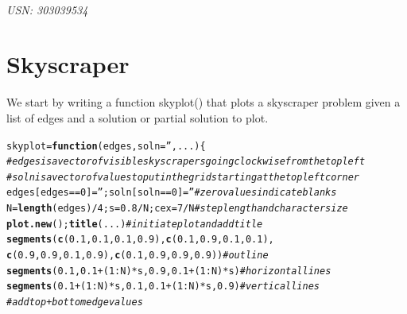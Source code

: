 \documentclass[12pt]{article}\usepackage[]{graphicx}\usepackage[]{color}
\makeatletter
\newcommand{\hlnum}[1]{\textcolor[rgb]{0.686,0.059,0.569}{#1}}%
\newcommand{\hlstr}[1]{\textcolor[rgb]{0.192,0.494,0.8}{#1}}%
\newcommand{\hlcom}[1]{\textcolor[rgb]{0.678,0.584,0.686}{\textit{#1}}}%
\newcommand{\hlopt}[1]{\textcolor[rgb]{0,0,0}{#1}}%
\newcommand{\hlstd}[1]{\textcolor[rgb]{0.345,0.345,0.345}{#1}}%
\newcommand{\hlkwa}[1]{\textcolor[rgb]{0.161,0.373,0.58}{\textbf{#1}}}%
\newcommand{\hlkwb}[1]{\textcolor[rgb]{0.69,0.353,0.396}{#1}}%
\newcommand{\hlkwc}[1]{\textcolor[rgb]{0.333,0.667,0.333}{#1}}%
\newcommand{\hlkwd}[1]{\textcolor[rgb]{0.737,0.353,0.396}{\textbf{#1}}}%
\newenvironment{kframe}{%
 \def\at@end@of@kframe{}%
 \ifinner\ifhmode%
  \def\at@end@of@kframe{\end{minipage}}%
  \begin{minipage}{\columnwidth}%
 \fi\fi%
 \def\FrameCommand##1{\hskip\@totalleftmargin \hskip-\fboxsep
 \colorbox{shadecolor}{##1}\hskip-\fboxsep
     \hskip-\linewidth \hskip-\@totalleftmargin \hskip\columnwidth}%
 \MakeFramed {\advance\hsize-\width
   \@totalleftmargin\z@ \linewidth\hsize
   \@setminipage}}%
 {\par\unskip\endMakeFramed%
 \at@end@of@kframe}
\newenvironment{knitrout}{}{} %
\makeatother
\begin{document}
\begin{center}
\textbf{\Large{}}\\
\textit{USN: 303039534}
\end{center}



\section{Skyscraper}
We start by writing a function skyplot() that plots a skyscraper problem given a list of edges and a solution or partial solution to plot.
\begin{knitrout}
\color{fgcolor}\begin{kframe}
\begin{alltt}
\hlstd{skyplot} \hlkwb{=} \hlkwa{function}\hlstd{(}\hlkwc{edges}\hlstd{,} \hlkwc{soln} \hlstd{=} \hlstr{''}\hlstd{,} \hlkwc{...}\hlstd{)\{}
  \hlcom{#edges is a vector of visible skyscrapers going clockwise from the top left}
  \hlcom{#soln is a vector of values to put in the grid starting at the top left corner}
  \hlstd{edges[edges} \hlopt{==} \hlnum{0}\hlstd{]} \hlkwb{=} \hlstr{''}\hlstd{; soln[soln}\hlopt{==}\hlnum{0}\hlstd{]}\hlkwb{=}\hlstr{''} \hlcom{#zero values indicate blanks}
  \hlstd{N} \hlkwb{=} \hlkwd{length}\hlstd{(edges)} \hlopt{/} \hlnum{4}\hlstd{; s} \hlkwb{=} \hlnum{0.8}\hlopt{/}\hlstd{N; cex} \hlkwb{=} \hlnum{7}\hlopt{/}\hlstd{N} \hlcom{#step length and character size}
  \hlkwd{plot.new}\hlstd{();} \hlkwd{title}\hlstd{(...)} \hlcom{#initiate plot and add title}
  \hlkwd{segments}\hlstd{(} \hlkwd{c}\hlstd{(}\hlnum{0.1}\hlstd{,}\hlnum{0.1}\hlstd{,}\hlnum{0.1}\hlstd{,}\hlnum{0.9}\hlstd{),} \hlkwd{c}\hlstd{(}\hlnum{0.1}\hlstd{,}\hlnum{0.9}\hlstd{,}\hlnum{0.1}\hlstd{,}\hlnum{0.1}\hlstd{),}
            \hlkwd{c}\hlstd{(}\hlnum{0.9}\hlstd{,}\hlnum{0.9}\hlstd{,}\hlnum{0.1}\hlstd{,}\hlnum{0.9}\hlstd{),} \hlkwd{c}\hlstd{(}\hlnum{0.1}\hlstd{,}\hlnum{0.9}\hlstd{,}\hlnum{0.9}\hlstd{,}\hlnum{0.9}\hlstd{) )} \hlcom{#outline}
  \hlkwd{segments}\hlstd{(}\hlnum{0.1}\hlstd{,} \hlnum{0.1}\hlopt{+}\hlstd{(}\hlnum{1}\hlopt{:}\hlstd{N)}\hlopt{*}\hlstd{s,} \hlnum{0.9}\hlstd{,} \hlnum{0.1}\hlopt{+}\hlstd{(}\hlnum{1}\hlopt{:}\hlstd{N)}\hlopt{*}\hlstd{s)} \hlcom{#horizontal lines}
  \hlkwd{segments}\hlstd{(}\hlnum{0.1}\hlopt{+}\hlstd{(}\hlnum{1}\hlopt{:}\hlstd{N)}\hlopt{*}\hlstd{s,} \hlnum{0.1}\hlstd{,} \hlnum{0.1}\hlopt{+}\hlstd{(}\hlnum{1}\hlopt{:}\hlstd{N)}\hlopt{*}\hlstd{s,} \hlnum{0.9}\hlstd{)} \hlcom{#vertical lines}
  \hlcom{#add top + bottom edge values}

\end{alltt}
\end{kframe}
\end{knitrout}
\end{document}
